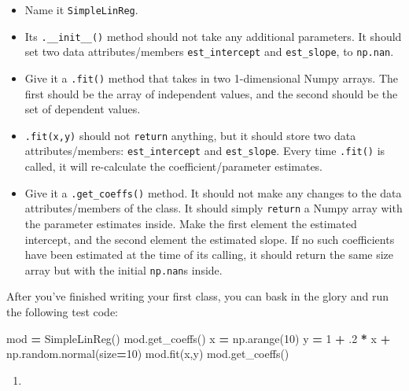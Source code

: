 \documentclass[
  12pt,
  krantz2]{krantz}
\makeatletter
\newenvironment{Shaded}{\begin{snugshade}}{\end{snugshade}}
\newcommand{\DecValTok}[1]{\textcolor[rgb]{0.06,0.06,0.06}{#1}}
\newcommand{\FloatTok}[1]{\textcolor[rgb]{0.06,0.06,0.06}{#1}}
\newcommand{\NormalTok}[1]{#1}
\newcommand{\OperatorTok}[1]{\textcolor[rgb]{0.43,0.43,0.43}{\textbf{#1}}}
\providecommand{\tightlist}{%
  \setlength{\itemsep}{0pt}\setlength{\parskip}{0pt}}
\newenvironment{kframe}{%
\medskip{}
\setlength{\fboxsep}{.8em}
 \def\at@end@of@kframe{}%
 \ifinner\ifhmode%
  \def\at@end@of@kframe{\end{minipage}}%
  \begin{minipage}{\columnwidth}%
 \fi\fi%
 \def\FrameCommand##1{\hskip\@totalleftmargin \hskip-\fboxsep
 \colorbox{shadecolor}{##1}\hskip-\fboxsep
     \hskip-\linewidth \hskip-\@totalleftmargin \hskip\columnwidth}%
 \MakeFramed {\advance\hsize-\width
   \@totalleftmargin\z@ \linewidth\hsize
   \@setminipage}}%
 {\par\unskip\endMakeFramed%
 \at@end@of@kframe}
\renewenvironment{Shaded}{\begin{kframe}}{\end{kframe}}
\makeatother
\begin{document}
\begin{itemize}
\tightlist
\item
  Name it \texttt{SimpleLinReg}.
\item
  Its \texttt{.\_\_init\_\_()} method should not take any additional parameters. It should set two data attributes/members \texttt{est\_intercept} and \texttt{est\_slope}, to \texttt{np.nan}.
\item
  Give it a \texttt{.fit()} method that takes in two 1-dimensional Numpy arrays. The first should be the array of independent values, and the second should be the set of dependent values.
\item
  \texttt{.fit(x,y)} should not \texttt{return} anything, but it should store two data attributes/members: \texttt{est\_intercept} and \texttt{est\_slope}. Every time \texttt{.fit()} is called, it will re-calculate the coefficient/parameter estimates.
\item
  Give it a \texttt{.get\_coeffs()} method. It should not make any changes to the data attributes/members of the class. It should simply \texttt{return} a Numpy array with the parameter estimates inside. Make the first element the estimated intercept, and the second element the estimated slope. If no such coefficients have been estimated at the time of its calling, it should return the same size array but with the initial \texttt{np.nan}s inside.
\end{itemize}

After you've finished writing your first class, you can bask in the glory and run the following test code:

\begin{Shaded}
\begin{Highlighting}[]
\NormalTok{mod }\OperatorTok{=}\NormalTok{ SimpleLinReg()}
\NormalTok{mod.get\_coeffs()}
\NormalTok{x }\OperatorTok{=}\NormalTok{ np.arange(}\DecValTok{10}\NormalTok{)}
\NormalTok{y }\OperatorTok{=} \DecValTok{1} \OperatorTok{+} \FloatTok{.2} \OperatorTok{*}\NormalTok{ x }\OperatorTok{+}\NormalTok{ np.random.normal(size}\OperatorTok{=}\DecValTok{10}\NormalTok{)}
\NormalTok{mod.fit(x,y)}
\NormalTok{mod.get\_coeffs()}
\end{Highlighting}
\end{Shaded}

\begin{enumerate}
\def\labelenumi{\arabic{enumi}.}
\setcounter{enumi}{1}
\tightlist
\item
\end{enumerate}
\end{document}
